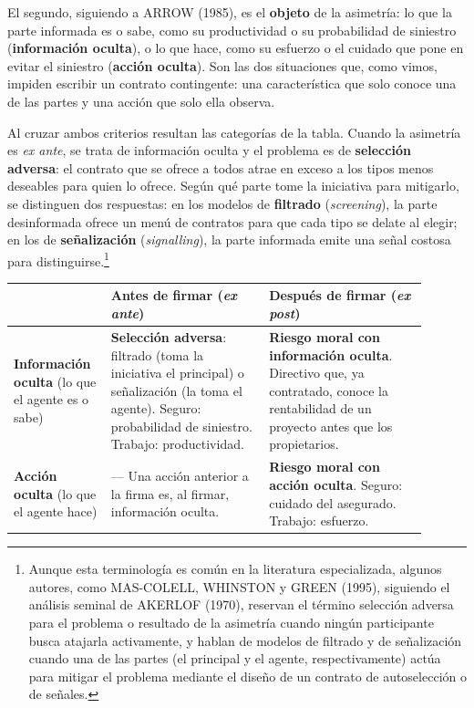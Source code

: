 \documentclass[10pt,a4paper]{article}
\begin{document}
El segundo, siguiendo a ARROW (1985), es el \textbf{objeto} de la asimetría: lo que la parte informada es o sabe, como su productividad o su probabilidad de siniestro (\textbf{información oculta}), o lo que hace, como su esfuerzo o el cuidado que pone en evitar el siniestro (\textbf{acción oculta}). Son las dos situaciones que, como vimos, impiden escribir un contrato contingente: una característica que solo conoce una de las partes y una acción que solo ella observa.

Al cruzar ambos criterios resultan las categorías de la tabla. Cuando la asimetría es \textit{ex ante}, se trata de información oculta y el problema es de \textbf{selección adversa}: el contrato que se ofrece a todos atrae en exceso a los tipos menos deseables para quien lo ofrece. Según qué parte tome la iniciativa para mitigarlo, se distinguen dos respuestas: en los modelos de \textbf{filtrado} (\textit{screening}), la parte desinformada ofrece un menú de contratos para que cada tipo se delate al elegir; en los de \textbf{señalización} (\textit{signalling}), la parte informada emite una señal costosa para distinguirse.\footnote{%
    Aunque esta terminología es común en la literatura especializada, algunos autores, como MAS-COLELL, WHINSTON y GREEN (1995), siguiendo el análisis seminal de AKERLOF (1970), reservan el término selección adversa para el problema o resultado de la asimetría cuando ningún participante busca atajarla activamente, y hablan de modelos de filtrado y de señalización cuando una de las partes (el principal y el agente, respectivamente) actúa para mitigar el problema mediante el diseño de un contrato de autoselección o de señales.
} 

\begin{center}
\renewcommand{\arraystretch}{1.3}
\setlength{\tabcolsep}{6pt}
\begin{tabular}{|p{0.2\linewidth}|p{0.35\linewidth}|p{0.35\linewidth}|}
\hline
 & \textbf{Antes de firmar} (\textit{ex ante}) & \textbf{Después de firmar} (\textit{ex post}) \\
\hline
\textbf{Información oculta} {\small (lo que el agente es o sabe)} &
\textbf{Selección adversa}: filtrado (toma la iniciativa el principal) o señalización (la toma el agente). {\small Seguro: probabilidad de siniestro. Trabajo: productividad.} &
\textbf{Riesgo moral con información oculta}. {\small Directivo que, ya contratado, conoce la rentabilidad de un proyecto antes que los propietarios.} \\
\hline
\textbf{Acción oculta} {\small (lo que el agente hace)} &
--- {\small Una acción anterior a la firma es, al firmar, información oculta.} &
\textbf{Riesgo moral con acción oculta}. {\small Seguro: cuidado del asegurado. Trabajo: esfuerzo.} \\
\hline
\end{tabular}
\end{center}
\end{document}
